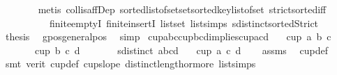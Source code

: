 \begin{isabellebody}
\ \ \ \ \ \ \isamarkupfalse%
\ {\isacharparenleft}{\kern0pt}metis\ coll{\isacharunderscore}{\kern0pt}is{\isacharunderscore}{\kern0pt}affDep\ sorted{\isacharunderscore}{\kern0pt}list{\isacharunderscore}{\kern0pt}of{\isacharunderscore}{\kern0pt}set{\isachardot}{\kern0pt}set{\isacharunderscore}{\kern0pt}sorted{\isacharunderscore}{\kern0pt}key{\isacharunderscore}{\kern0pt}list{\isacharunderscore}{\kern0pt}of{\isacharunderscore}{\kern0pt}set\ strict{\isacharunderscore}{\kern0pt}sorted{\isacharunderscore}{\kern0pt}iff\isanewline
\ \ \ \ \ \ \ \ \ \ finite{\isachardot}{\kern0pt}emptyI\ finite{\isachardot}{\kern0pt}insertI\ list{\isachardot}{\kern0pt}set{\isacharparenleft}{\kern0pt}{}{\isacharparenright}{\kern0pt}\ list{\isachardot}{\kern0pt}simps{\isacharparenleft}{\kern0pt}{}{}{\isacharparenright}{\kern0pt}\ sdistinct{\isacharunderscore}{\kern0pt}sortedStrict{\isacharparenright}{\kern0pt}\isanewline
\ \ \isamarkupfalse%
\isanewline
\ \ \isamarkupfalse%
\ {\isacharquery}{\kern0pt}thesis\ \isamarkupfalse%
\ gpos{\isacharunderscore}{\kern0pt}generalpos\ \isamarkupfalse%
\ simp\isanewline
{}\isamarkupfalse%
%
\endisatagproof
{\isafoldproof}%
%
\isadelimproof
\isanewline
%
\endisadelimproof
\isanewline
\isanewline
{}\isamarkupfalse%
\ cup{\isacharunderscore}{\kern0pt}abc{\isacharunderscore}{\kern0pt}cup{\isacharunderscore}{\kern0pt}bcd{\isacharunderscore}{\kern0pt}implies{\isacharunderscore}{\kern0pt}cup{\isacharunderscore}{\kern0pt}acd{\isacharcolon}{\kern0pt}\isanewline
\ \ \ {\isachardoublequoteopen}cup{}\ a\ b\ c{\isachardoublequoteclose}\isanewline
\ \ \ \ \ \ \ {\isachardoublequoteopen}cup{}\ b\ c\ d{\isachardoublequoteclose}\isanewline
\ \ \ \ \ \ \ {\isachardoublequoteopen}sdistinct\ {\isacharbrackleft}{\kern0pt}a{\isacharcomma}{\kern0pt}b{\isacharcomma}{\kern0pt}c{\isacharcomma}{\kern0pt}d{\isacharbrackright}{\kern0pt}{\isachardoublequoteclose}\isanewline
{}\ \ \ {\isachardoublequoteopen}cup{}\ a\ c\ d{\isachardoublequoteclose}\isanewline
%
\isadelimproof
\ \ %
\endisadelimproof
%
\isatagproof
{}\isamarkupfalse%
\ assms\ \isamarkupfalse%
\ cup{}{\isacharunderscore}{\kern0pt}def\isanewline
\ \ \isamarkupfalse%
\ {\isacharparenleft}{\kern0pt}smt\ {\isacharparenleft}{\kern0pt}verit{\isacharparenright}{\kern0pt}\ cup{}{\isacharunderscore}{\kern0pt}def\ cup{}{\isacharunderscore}{\kern0pt}slope\ distinct{\isacharunderscore}{\kern0pt}length{\isacharunderscore}{\kern0pt}{}{\isacharunderscore}{\kern0pt}or{\isacharunderscore}{\kern0pt}more\ list{\isachardot}{\kern0pt}simps{\isacharparenleft}{\kern0pt}{}{\isacharparenright}{\kern0pt}\isanewline

\end{isabellebody}
